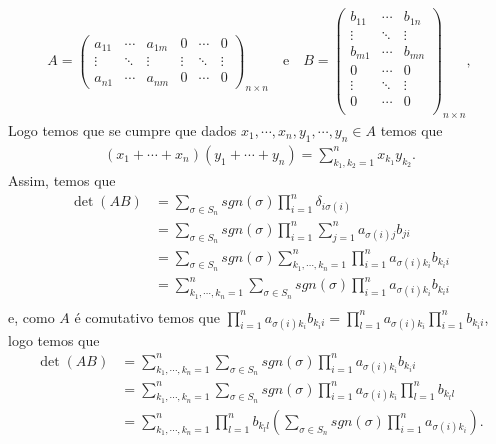 \documentclass{article}
\begin{document}
\begin{align*}
  A=\begin{pmatrix}
    a_{11} & \cdots & a_{1m} & 0 & \cdots & 0\\
    \vdots & \ddots & \vdots & \vdots & \ddots & \vdots\\
    a_{n1} & \cdots & a_{nm} & 0 & \cdots & 0
  \end{pmatrix}_{n\times n}\quad\text{e}\quad B=\begin{pmatrix}
    b_{11} & \cdots & b_{1n}\\
    \vdots & \ddots & \vdots\\
    b_{m1} & \cdots & b_{mn}\\
    0      & \cdots & 0\\
    \vdots & \ddots & \vdots\\
    0      & \cdots & 0\\
  \end{pmatrix}_{n\times n},
\end{align*}
Logo temos que se cumpre que dados $x_1,\cdots,x_n,y_1,\cdots,y_n\in A$ temos que
\begin{align*}
  (x_1+\cdots+x_n)(y_1+\cdots+y_n)=\sum_{k_1,k_2=1}^{n}x_{k_1}y_{k_2}.
\end{align*}
Assim, temos que
\begin{align*}
  \det(AB)&=\sum_{\sigma\in S_{n}}sgn(\sigma)\prod_{i=1}^{n}\delta_{i\sigma(i)}\\
  &=\sum_{\sigma\in S_{n}}sgn(\sigma)\prod_{i=1}^{n}\sum_{j=1}^{n}a_{\sigma(i)j}b_{ji}\\
  &=\sum_{\sigma\in S_{n}}sgn(\sigma)\sum_{k_1,\cdots,k_n=1}^{n}\prod_{i=1}^{n}a_{\sigma(i)k_{i}}b_{k_{i}i}\\
  &=\sum_{k_1,\cdots,k_n=1}^{n}\sum_{\sigma\in S_{n}}sgn(\sigma)\prod_{i=1}^{n}a_{\sigma(i)k_{i}}b_{k_{i}i}\\
\end{align*}
e, como $A$ é comutativo temos que $\prod_{i=1}^{n}a_{\sigma(i)k_i}b_{k_ii}=\prod_{l=1}^{n}a_{\sigma(i)k_i}\prod_{i=1}^{n}b_{k_ii}$, logo temos que
\begin{align*}
  \det(AB)&=\sum_{k_1,\cdots,k_n=1}^{n}\sum_{\sigma\in S_{n}}sgn(\sigma)\prod_{i=1}^{n}a_{\sigma(i)k_{i}}b_{k_{i}i}\\
  &=\sum_{k_1,\cdots,k_n=1}^{n}\sum_{\sigma\in S_{n}}sgn(\sigma)\prod_{i=1}^{n}a_{\sigma(i)k_{i}}\prod_{l=1}^{n}b_{k_{l}l}\\
  &=\sum_{k_1,\cdots,k_n=1}^{n}\prod_{l=1}^{n}b_{k_{l}l}\left(\sum_{\sigma\in S_{n}}sgn(\sigma)\prod_{i=1}^{n}a_{\sigma(i)k_{i}}\right).
\end{align*}
\end{document}
